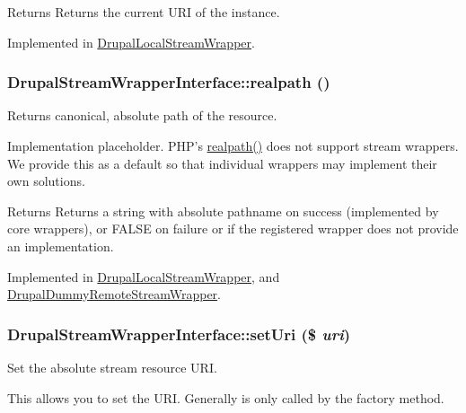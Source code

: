 \begin{DoxyReturn}{Returns}
Returns the current URI of the instance. 
\end{DoxyReturn}


Implemented in \hyperlink{classDrupalLocalStreamWrapper_a8dc69c121105a00949acfdcce0474aaa}{DrupalLocalStreamWrapper}.\hypertarget{interfaceDrupalStreamWrapperInterface_adb16cd1ac42f9d7a273546f5cbf0d9d3}{
\subsubsection[{realpath}]{\setlength{\rightskip}{0pt plus 5cm}DrupalStreamWrapperInterface::realpath ()}}
\label{interfaceDrupalStreamWrapperInterface_adb16cd1ac42f9d7a273546f5cbf0d9d3}
Returns canonical, absolute path of the resource.

Implementation placeholder. PHP's \hyperlink{interfaceDrupalStreamWrapperInterface_adb16cd1ac42f9d7a273546f5cbf0d9d3}{realpath()} does not support stream wrappers. We provide this as a default so that individual wrappers may implement their own solutions.

\begin{DoxyReturn}{Returns}
Returns a string with absolute pathname on success (implemented by core wrappers), or FALSE on failure or if the registered wrapper does not provide an implementation. 
\end{DoxyReturn}


Implemented in \hyperlink{classDrupalLocalStreamWrapper_a61f0d0ef6a489e3fca2152eb64174237}{DrupalLocalStreamWrapper}, and \hyperlink{classDrupalDummyRemoteStreamWrapper_afda5b6262eed01b4f22523af92ea6f9b}{DrupalDummyRemoteStreamWrapper}.\hypertarget{interfaceDrupalStreamWrapperInterface_aa04b517df51d24252e656d67515224f6}{
\subsubsection[{setUri}]{\setlength{\rightskip}{0pt plus 5cm}DrupalStreamWrapperInterface::setUri (\$ {\em uri})}}
\label{interfaceDrupalStreamWrapperInterface_aa04b517df51d24252e656d67515224f6}
Set the absolute stream resource URI.

This allows you to set the URI. Generally is only called by the factory method.


